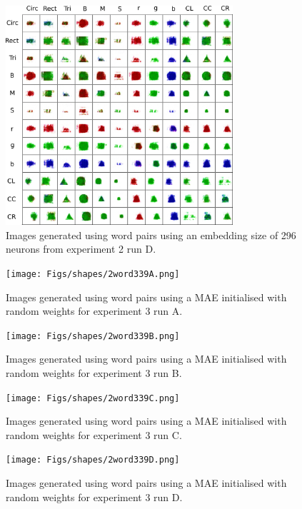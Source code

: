 \begin{figure}
\centering
\includegraphics[width=0.75\textwidth]{Figs/shapes/2word333D.png}
\caption{Images generated using word pairs using an embedding size of 296 neurons from experiment 2 run D.}
\label{fig:2word333D}
\end{figure}



\begin{figure}
\centering
\texttt{[image: Figs/shapes/2word339A.png]}
\caption{Images generated using word pairs using a MAE initialised with random weights for experiment 3 run A.}
\label{fig:2word339A}
\end{figure}

\begin{figure}
\centering
\texttt{[image: Figs/shapes/2word339B.png]}
\caption{Images generated using word pairs using a MAE initialised with random weights for experiment 3 run B.}
\label{fig:2word339B}
\end{figure}

\begin{figure}
\centering
\texttt{[image: Figs/shapes/2word339C.png]}
\caption{Images generated using word pairs using a MAE initialised with random weights for experiment 3 run C.}
\label{fig:2word339C}
\end{figure}

\begin{figure}
\centering
\texttt{[image: Figs/shapes/2word339D.png]}
\caption{Images generated using word pairs using a MAE initialised with random weights for experiment 3 run D.}
\label{fig:2word339D}
\end{figure}

